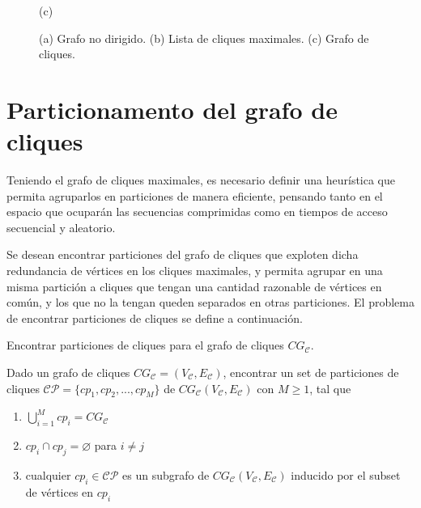 \begin{figure}
\begin{minipage}{0.15\textwidth}
    		(c)
    	\end{minipage}
    \caption{(a) Grafo no dirigido. (b) Lista de cliques maximales. (c) Grafo de cliques.}
    \label{fig:gafoEj}
\end{figure}




\section{Particionamento del grafo de cliques}

Teniendo el grafo de cliques maximales, es necesario definir una heurística que permita agruparlos en particiones de manera eficiente, pensando tanto en el espacio que ocuparán las secuencias comprimidas como en tiempos de acceso secuencial y aleatorio.

Se desean encontrar particiones del grafo de cliques que exploten dicha redundancia de vértices en los cliques maximales, y permita agrupar en una misma partición a cliques que tengan una cantidad razonable de vértices en común, y los que no la tengan queden separados en otras particiones. El problema de encontrar particiones de cliques se define a continuación.

\begin{problem}
	\label{def:findPartitions}
	Encontrar particiones de cliques para el grafo de cliques $CG_{\mathcal{C}}$.
	
	Dado un grafo de cliques $CG_{\mathcal{C}} = (V_{\mathcal{C}}, E_{\mathcal{C}})$, encontrar un set de particiones de cliques $\mathcal{C}\mathcal{P} = \{cp_{1}, cp_{2}, ..., cp_{M}\}$ de $CG_{\mathcal{C}}(V_{\mathcal{C}}, E_{\mathcal{C}})$ con $M \geq 1$, tal que
	\begin{enumerate}
		\item $\bigcup\limits_{i = 1}^{M} cp_{i} = CG_{\mathcal{C}}$ \label{item:particiones1}
		\item $cp_{i} \cap cp_{j} = \varnothing$ para $i \neq j$ \label{item:particiones2}
		\item cualquier $cp_{i} \in \mathcal{C}\mathcal{P}$ es un subgrafo de $CG_{\mathcal{C}}(V_{\mathcal{C}}, E_{\mathcal{C}})$ inducido por el subset de vértices en $cp_{i}$ \label{item:particiones3}
	\end{enumerate}
	
\end{problem}

